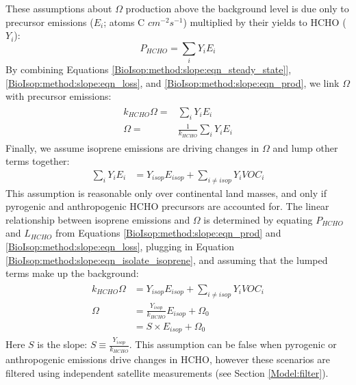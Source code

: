     These assumptions about $\Omega$ production above the background level is due only to precursor emissions ($E_i$; atoms C $cm^{-2} s^{-1}$) multiplied by their yields to HCHO ($Y_i$):
    \begin{equation}
      \label{BioIsop:method:slope:eqn_prod}
      P_{HCHO}  = \sum_i Y_i E_i 
    \end{equation}
    By combining Equations \ref{BioIsop:method:slope:eqn_steady_state]}, \ref{BioIsop:method:slope:eqn_loss}, and \ref{BioIsop:method:slope:eqn_prod}, we link $\Omega$ with precursor emissions:
    \begin{eqnarray} \begin{split}
      k_{HCHO} \Omega = & \sum_i Y_i E_i \\
      \Omega = & \frac{1}{k_{HCHO}} \sum_i Y_i E_i
    \end{split} \end{eqnarray}
    Finally, we assume isoprene emissions are driving changes in $\Omega$ \parencite[as seen elsewhere, e.g.][]{Palmer2003,Millet2008,Marais2014,Stavrakou2015} and lump other terms together:
    \begin{eqnarray}
      \label{BioIsop:method:slope:eqn_isolate_isoprene}
      \sum_i Y_i E_i  & = Y_{isop} E_{isop} + \sum_{i \ne isop} Y_{i} VOC_{i} 
    \end{eqnarray}
    This assumption is reasonable only over continental land masses, and only if pyrogenic and anthropogenic HCHO precursors are accounted for.
    The linear relationship between isoprene emissions and $\Omega$ is determined by equating $P_{HCHO}$ and $L_{HCHO}$ from Equations \ref{BioIsop:method:slope:eqn_prod} and \ref{BioIsop:method:slope:eqn_loss}, plugging in Equation \ref{BioIsop:method:slope:eqn_isolate_isoprene}, and assuming that the lumped terms make up the background:
    \begin{eqnarray} 
      \label{BioIsop:method:slope:eqn_isop_to_hcho}
      \begin{split}
        k_{HCHO}\Omega 
        & = Y_{isop} E_{isop} + \sum_{i \ne isop} Y_{i} VOC_{i} \\
        \Omega 
        & = \frac{Y_{isop}}{k_{HCHO}} E_{isop} + \Omega_0 \\
        & = S \times E_{isop} + \Omega_0
      \end{split} 
    \end{eqnarray}
    Here $S$ is the slope: $S \equiv \frac{Y_{isop}}{k_{HCHO}}$.
    This assumption can be false when pyrogenic or anthropogenic emissions drive changes in HCHO, however these scenarios are filtered using independent satellite measurements (see Section \ref{Model:filter}).
    
